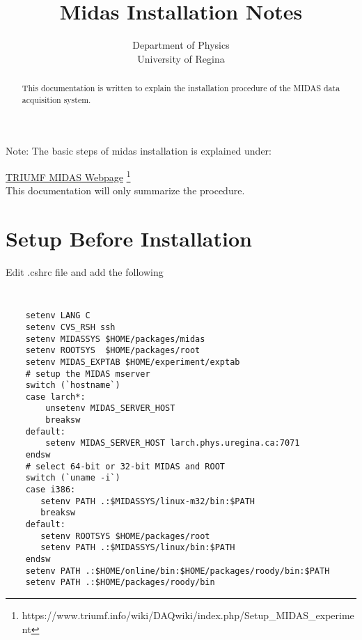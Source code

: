 \documentclass[12pt, letterpaper]{article}
\title{Midas Installation Notes}
\author{Department of Physics \\ University of Regina}
\begin{document}
\maketitle

\doublespace

\begin{abstract}
This documentation is written to explain the installation procedure of the MIDAS data acquisition system. 
\end{abstract}




Note:
The basic steps of midas installation is explained under:

{\centering
\href{https://www.triumf.info/wiki/DAQwiki/index.php/Setup\_MIDAS\_experiment}{\underline{TRIUMF MIDAS Webpage}} \footnote{https://www.triumf.info/wiki/DAQwiki/index.php/Setup\_MIDAS\_experiment}\\

This documentation will only summarize the procedure. 
}

\section{Setup Before Installation}


Edit .cshrc file and add the following

{\tt 
\begin{lstlisting}
    setenv LANG C
    setenv CVS_RSH ssh
    setenv MIDASSYS $HOME/packages/midas
    setenv ROOTSYS  $HOME/packages/root
    setenv MIDAS_EXPTAB $HOME/experiment/exptab
    # setup the MIDAS mserver
    switch (`hostname`)
    case larch*:
        unsetenv MIDAS_SERVER_HOST
        breaksw
    default:
        setenv MIDAS_SERVER_HOST larch.phys.uregina.ca:7071
    endsw
    # select 64-bit or 32-bit MIDAS and ROOT
    switch (`uname -i`)
    case i386:
       setenv PATH .:$MIDASSYS/linux-m32/bin:$PATH
       breaksw
    default:
       setenv ROOTSYS $HOME/packages/root
       setenv PATH .:$MIDASSYS/linux/bin:$PATH
    endsw
    setenv PATH .:$HOME/online/bin:$HOME/packages/roody/bin:$PATH
    setenv PATH .:$HOME/packages/roody/bin
\end{lstlisting}
}

% 
\end{document}
